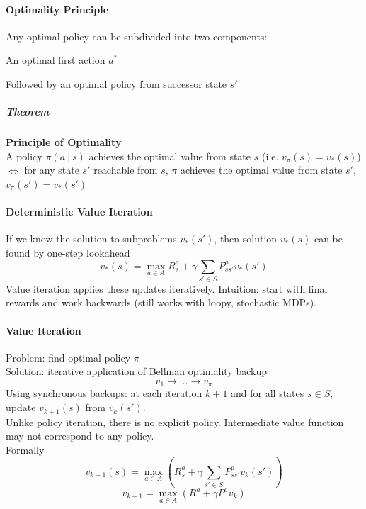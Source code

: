 \documentclass[10pt]{report}
\begin{document}
\paragraph{Optimality Principle} Any optimal policy can be subdivided into two components:
\begin{list}{}{}
	\item An optimal first action $a^*$
	\item Followed by an optimal policy from successor state $s'$
\end{list}
\subparagraph{Theorem} \textbf{Principle of Optimality}\\
A policy $\pi(a\:|\:s)$ achieves the optimal value from state $s$ (i.e. $v_\pi(s) = v_*(s)$) $\Leftrightarrow$ for any state $s'$ reachable from $s$, $\pi$ achieves the optimal value from state $s'$, $v_\pi(s') = v_*(s')$
\paragraph{Deterministic Value Iteration} If we know the solution to subproblems $v_*(s')$, then solution $v_*(s)$ can be found by one-step lookahead
$$v_*(s) = \max_{a\in A} R_s^a + \gamma\sum_{s'\in S} P_{ss'}^av_*(s')$$
Value iteration applies these updates iteratively. Intuition: start with final rewards and work backwards (still works with loopy, stochastic MDPs).
\paragraph{Value Iteration} Problem: find optimal policy $\pi$\\
Solution: iterative application of Bellman optimality backup
$$v_1\rightarrow\ldots\rightarrow v_\pi$$
Using synchronous backups: at each iteration $k+1$ and for all states $s\in S$, update $v_{k+1}(s)$ from $v_k(s')$.\\
Unlike policy iteration, there is no explicit policy. Intermediate value function may not correspond to any policy.\\
Formally
$$v_{k+1}(s) = \max_{a\in A}\left(R_s^a + \gamma\sum_{s'\in S} P_{ss'}^a v_k(s')\right)$$
$$v_{k+1} = \max_{a\in A}(R^a + \gamma P^a v_k)$$
\end{document}
